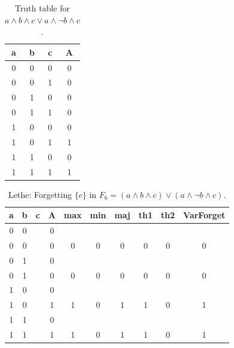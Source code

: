 \begin{table}[!tb]
    \centering
    \begin{tabular}{|c|c|c|c|}
        \hline
        \textbf{a} & \textbf{b} & \textbf{c} & \textbf{A} \\ \hline
        0 & 0 & 0 & 0 \\ \hline
        0 & 0 & 1 & 0 \\ \hline
        0 & 1 & 0 & 0 \\ \hline
        0 & 1 & 1 & 0 \\ \hline
        1 & 0 & 0 & 0 \\ \hline
        1 & 0 & 1 & 1 \\ \hline
        1 & 1 & 0 & 0 \\ \hline
        1 & 1 & 1 & 1 \\ \hline
    \end{tabular}
    \caption{Truth table for $a \land b \land c \lor a \land \lnot b \land c$.}
    \label{tab:truthtab}
\end{table}

\begin{table}[!tb]
    \centering
    \begin{tabular}{|c|c|c|c|c|c|c|c|c|c|}
        \hline
        \textbf{a} & \textbf{b} & \textbf{c} & \textbf{A} & \textbf{max} & \textbf{min} & \textbf{maj} & \textbf{th1} & \textbf{th2} & \textbf{VarForget} \\ \hline
        \rowcolor{gray!40} 0 & 0 &  & 0 &  &  &  &  &  &  \\ \hline
        \rowcolor{gray!40} 0 & 0 &  & 0 & 0 & 0 & 0 & 0 & 0 & 0 \\ \hline
        \rowcolor{blue!40} 0 & 1 &  & 0 &  &  &  &  &  &  \\ \hline
        \rowcolor{blue!40} 0 & 1 &  & 0 & 0 & 0 & 0 & 0 & 0 & 0 \\ \hline
        \rowcolor{red!40} 1 & 0 &  & 0 &  &  &  &  &  &  \\ \hline
        \rowcolor{red!40} 1 & 0 &  & 1 & 1 & 0 & 1 & 1 & 0 & 1 \\ \hline
        \rowcolor{green!40} 1 & 1 &  & 0 &  &  &  &  &  &  \\ \hline
        \rowcolor{green!40} 1 & 1 &  & 1 & 1 & 0 & 1 & 1 & 0 & 1 \\ \hline
    \end{tabular}
    \caption{Lethe: Forgetting $\{c\}$ in $F_{6} = (a \land b \land c) \lor (a \land \lnot b \land c)$.}
    \label{tab:lethe-F6-c}
\end{table}
